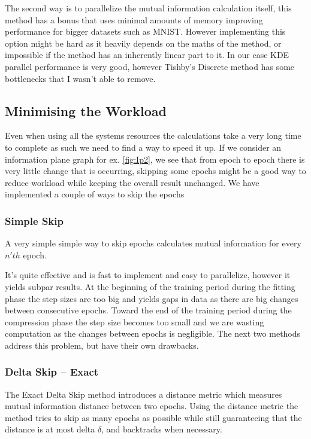 \documentclass[dissertation.tex]{subfiles}
\begin{document}
The second way is to parallelize the mutual information calculation itself, this
method has a  bonus that uses minimal amounts of memory improving performance
for bigger datasets such as MNIST. However implementing this option might be
hard as it heavily depends on the maths of the method, or impossible if the
method has an inherently linear part to it. In our case KDE parallel performance
is very good, however Tishby's Discrete method has some bottlenecks that I
wasn't able to remove.

\subsection{Minimising the Workload}

Even when using all the systems resources the calculations take a very long
time to complete as such we need to find a way to speed it up. If we consider an
information plane graph for ex. \autoref{fig:Ip2}, we see that from epoch to
epoch there is very little change that is occurring, skipping some epochs might
be a good way to reduce workload while keeping the overall result unchanged. We
have implemented a couple of ways to skip the epochs 

\subsubsection{Simple Skip}
  
  A very simple simple way to skip epochs calculates mutual information for
  every $n'th$ epoch.

  It's quite effective and is fast to implement and easy to parallelize, however
  it yields subpar results. At the beginning of the training period during the
  fitting phase the step sizes are too big and yields gaps in data as there are
  big changes between consecutive epochs. Toward the end of the training period
  during the compression phase the step size becomes too small and we are
  wasting computation as the changes between epochs is negligible. The next two
  methods address this problem, but have their own drawbacks.

\subsubsection{Delta Skip -- Exact}

  The Exact Delta Skip method introduces a distance metric which measures
  mutual information distance between two epochs. Using the distance metric the
  method tries to skip as many epochs as possible while still guaranteeing that
  the distance is at most delta $\delta$, and backtracks when necessary.
\end{document}
